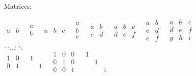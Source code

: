 \documentclass[12pt, a4paper]{article}
\begin{document}
Matrices:\textbf{ }

$\begin{matrix}
a & b & \\
\end{matrix}
\begin{matrix}
a & \\
b & \\
\end{matrix}
\begin{matrix}
a & b & c & \\
\end{matrix}
\begin{matrix}
a & \\
b & \\
c & \\
\end{matrix}
\begin{matrix}
a & b & \\
c & d & \\
\end{matrix}
\begin{matrix}
a & b & c & \\
d & e & f & \\
\end{matrix}
\begin{matrix}
a & b & \\
c & d & \\
e & f & \\
\end{matrix}
\begin{matrix}
a & b & c & \\
d & e & f & \\
g & h & i & \\
\end{matrix}
$\\


$\cdots \ldots \vdots \ddots $\\


$\begin{matrix}
1 & 0 & \\
0 & 1 & \\
\end{matrix}
\begin{matrix}
1 &  & \\
 & 1 & \\
\end{matrix}
\begin{matrix}
1 & 0 & 0 & \\
0 & 1 & 0 & \\
0 & 0 & 1 & \\
\end{matrix}
\begin{matrix}
1 &  &  & \\
 & 1 &  & \\
 &  & 1 & \\
\end{matrix}
$\\
\end{document}
